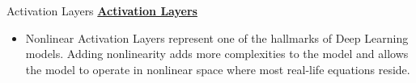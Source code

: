 \documentclass{beamer}
\begin{document}
\begin{frame}[fragile]{Activation Layers}
    \href{https://pytorch.org/docs/stable/nn.html#non-linear-activations-weighted-sum-nonlinearity}{\textbf{Activation Layers}} \\
    \begin{itemize}
        \item Nonlinear Activation Layers represent one of the hallmarks of Deep Learning models. Adding nonlinearity adds more complexities to the model and allows the model to operate in nonlinear space where most real-life equations reside.
    \end{itemize}
\end{frame}
\end{document}
